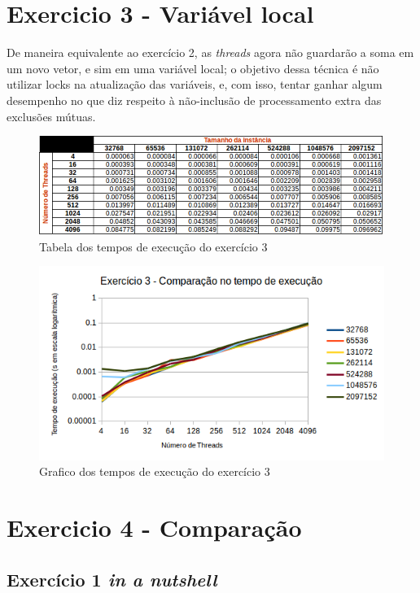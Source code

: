 \documentclass[a4paper, fontsize=12pt, parskip=half]{scrartcl}
\theoremstyle{mytheor}
\begin{document}
\section{Exercicio 3 - Variável local}
De maneira equivalente ao exercício 2, as \textit{threads} agora não guardarão a soma em um novo vetor, e sim em uma variável local; o objetivo dessa técnica é não utilizar locks na atualização das variáveis, e, com isso, tentar ganhar algum desempenho no que diz respeito à não-inclusão de processamento extra das exclusões mútuas.\\
\begin{figure}[htb!]
	\centering
	\includegraphics[width=1\linewidth]{gfx/3aQ}
	\caption{Tabela dos tempos de execução do exercício 3}
	\label{fig:3aq}
\end{figure}

\begin{figure}[htb!]
	\centering
	\includegraphics[width=1\linewidth]{gfx/3aQ_g}
	\caption{Grafico dos tempos de execução do exercício 3}
	\label{fig:3aq_g}
\end{figure}

\section{Exercicio 4 - Comparação}

\subsection{Exercício 1 \textit{in a nutshell}}
\end{document}
